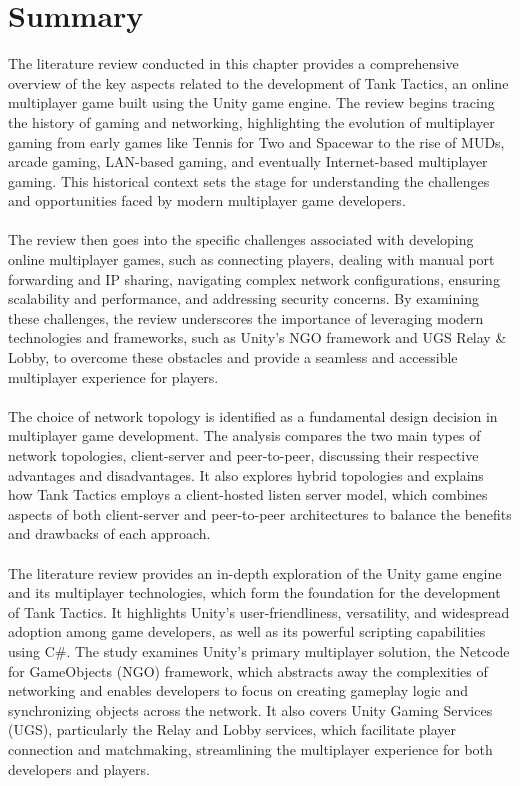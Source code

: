 \section{Summary} 
The literature review conducted in this chapter provides a comprehensive overview of the key aspects related to the development of Tank Tactics, an online multiplayer game built using the Unity game engine. The review begins tracing the history of gaming and networking, highlighting the evolution of multiplayer gaming from early games like Tennis for Two and Spacewar to the rise of MUDs, arcade gaming, LAN-based gaming, and eventually Internet-based multiplayer gaming. This historical context sets the stage for understanding the challenges and opportunities faced by modern multiplayer game developers.
\\
\noindent
\\
The review then goes into the specific challenges associated with developing online multiplayer games, such as connecting players, dealing with manual port forwarding and IP sharing, navigating complex network configurations, ensuring scalability and performance, and addressing security concerns. By examining these challenges, the review underscores the importance of leveraging modern technologies and frameworks, such as Unity's NGO framework and UGS Relay \& Lobby, to overcome these obstacles and provide a seamless and accessible multiplayer experience for players.
\\
\noindent
\\
The choice of network topology is identified as a fundamental design decision in multiplayer game development. The analysis compares the two main types of network topologies, client-server and peer-to-peer, discussing their respective advantages and disadvantages. It also explores hybrid topologies and explains how Tank Tactics employs a client-hosted listen server model, which combines aspects of both client-server and peer-to-peer architectures to balance the benefits and drawbacks of each approach.
\\
\noindent
\\
The literature review provides an in-depth exploration of the Unity game engine and its multiplayer technologies, which form the foundation for the development of Tank Tactics. It highlights Unity's user-friendliness, versatility, and widespread adoption among game developers, as well as its powerful scripting capabilities using C\#. The study examines Unity's primary multiplayer solution, the Netcode for GameObjects (NGO) framework, which abstracts away the complexities of networking and enables developers to focus on creating gameplay logic and synchronizing objects across the network. It also covers Unity Gaming Services (UGS), particularly the Relay and Lobby services, which facilitate player connection and matchmaking, streamlining the multiplayer experience for both developers and players.
